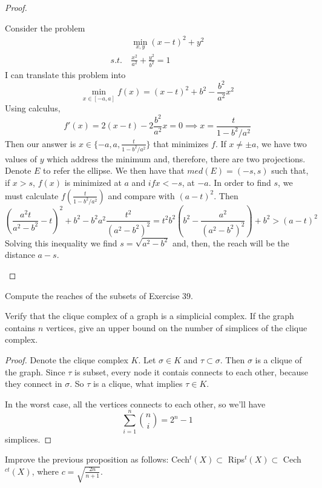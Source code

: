 \begin{proof}
\begin{enumerate}
    Consider the problem
    \begin{align*}
        &\min_{x,y} (x - t)^2 + y^2 \\
        s.t. ~& \frac{x^2}{a^2} + \frac{y^2}{b^2} = 1
    \end{align*}
    I can translate this problem into 
    $$
    \min_{x \in [-a,a]} f(x) = (x - t)^2 + b^2 - \frac{b^2}{a^2}x^2
    $$
    Using calculus, 
    $$
    f'(x) = 2(x - t) - 2\frac{b^2}{a^2}x = 0 \implies x = \frac{t}{1 - b^2/a^2}
    $$
    Then our answer is $x \in \{-a, a, \frac{t}{1 - b^2/a^2}\}$ that minimizes
    $f$. If $x \neq \pm a$, we have two values of $y$ which address the
    minimum and, therefore, there are two projections. Denote $E$ to refer the ellipse. We then have that $med(E) =
    (-s,s)$
    such that, if $x > s$, $f(x)$ is minimized at $a$ and $if x < -s$, at
    $-a$. In order to find $s$, we must calculate $f(\frac{t}{1 - b^2/a^2})$
    and compare with $(a - t)^2$. Then 
    $$
    \left(\frac{a^2t}{a^2 - b^2} - t\right)^2 + b^2 - b^2a^2\frac{t^2}{(a^2 - b^2)^2} = t^2b^2\left(b^2 - \frac{a^2}{(a^2 - b^2)^2}\right) + b^2 > (a - t)^2
    $$
    Solving this inequality we find $s = \sqrt{a^2 - b^2}$ and, then, the reach will be the
    distance $a - s$. 

\end{enumerate}

\end{proof}

\noindent\linia

\begin{exercise}
    Compute the reaches of the subsets of Exercise 39.
\end{exercise}

\noindent\linia

\begin{exercise}
    Verify that the clique complex of a graph is a simplicial complex. If the
    graph contains $n$ vertices, give an upper bound on the number of
    simplices of the clique complex.
\end{exercise}

\begin{proof}

Denote the clique complex $K$. Let $\sigma \in K$ and $\tau \subset \sigma$.
Then $\sigma$ is a clique of the graph. Since $\tau$ is subset, every node it
contais connects to each other, because they connect in $\sigma$. So $\tau$ is
a clique, what implies $\tau \in K$.

In the worst case, all the vertices connects to each other, so we'll have 
$$
\sum_{i=1}^n \genfrac(){0pt}{}{n}{i} = 2^n - 1
$$
simplices.

\end{proof}

\noindent\linia

\begin{exercise}
    Improve the previous proposition as follows: Cech$^t(X) \subset $
    Rips$^t(X) \subset $ Cech$^{ct}(X)$, where $c = \sqrt{\frac{2n}{n+1}}$.
\end{exercise}